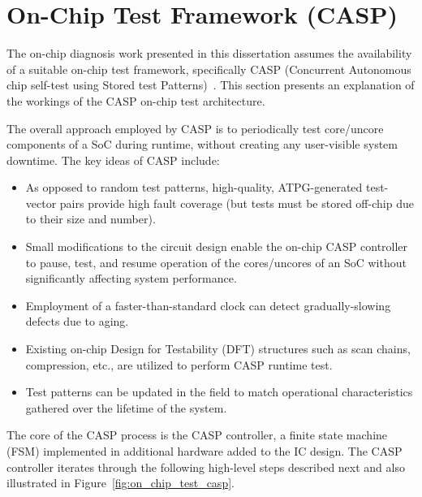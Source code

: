 \section{On-Chip Test Framework (CASP)}
\label{sec:intro_casp}

The on-chip diagnosis work presented in this dissertation assumes the availability of a suitable on-chip test framework, specifically CASP (Concurrent Autonomous chip self-test using Stored test Patterns)~\cite{li08,li10casp,li13}.
%
This section presents an explanation of the workings of the CASP on-chip test architecture.

The overall approach employed by CASP is to periodically test core/uncore components of a SoC during runtime, without creating any user-visible system downtime.
%
The key ideas of CASP include:
\begin{itemize}
\item As opposed to random test patterns, high-quality, ATPG-generated test-vector pairs provide high fault coverage (but tests must be stored off-chip due to their size and number).
\item Small modifications to the circuit design enable the on-chip CASP controller to pause, test, and resume operation of the cores/uncores of an SoC without significantly affecting system performance.
\item Employment of a faster-than-standard clock can detect gradually-slowing defects due to aging.
\item Existing on-chip Design for Testability (DFT) structures such as scan chains, compression, etc., are utilized to perform CASP runtime test.
\item Test patterns can be updated in the field to match operational characteristics gathered over the lifetime of the system.
\end{itemize}

The core of the CASP process is the CASP controller, a finite state machine (FSM) implemented in additional hardware added to the IC design.
%
The CASP controller iterates through the following high-level steps described next and also illustrated in Figure~\ref{fig:on_chip_test_casp}.

